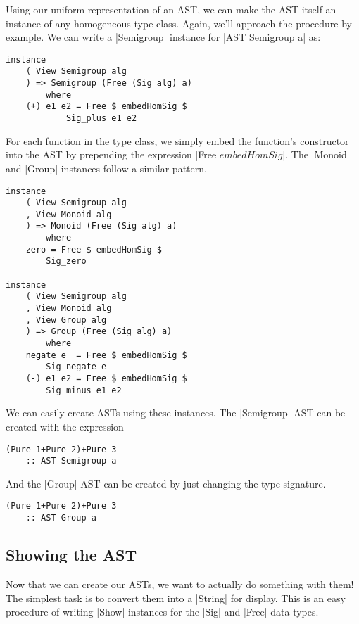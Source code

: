 \documentclass[preprint]{sigplanconf}
\theoremstyle{definition}
\begin{document}

Using our uniform representation of an AST,
we can make the AST itself an instance of any homogeneous type class.
Again, we'll approach the procedure by example.
We can write a |Semigroup| instance for |AST Semigroup a| as:
\begin{lstlisting}
instance
    ( View Semigroup alg
    ) => Semigroup (Free (Sig alg) a)
        where
    (+) e1 e2 = Free $ embedHomSig $
            Sig_plus e1 e2
\end{lstlisting}
For each function in the type class,
we simply embed the function's constructor into the AST by prepending the expression |Free $ embedHomSig $|.
The |Monoid| and |Group| instances follow a similar pattern.
\begin{lstlisting}
instance
    ( View Semigroup alg
    , View Monoid alg
    ) => Monoid (Free (Sig alg) a)
        where
    zero = Free $ embedHomSig $
        Sig_zero

instance
    ( View Semigroup alg
    , View Monoid alg
    , View Group alg
    ) => Group (Free (Sig alg) a)
        where
    negate e  = Free $ embedHomSig $
        Sig_negate e
    (-) e1 e2 = Free $ embedHomSig $
        Sig_minus e1 e2
\end{lstlisting}
We can easily create ASTs using these instances.
The |Semigroup| AST can be created with the expression
\begin{lstlisting}
(Pure 1+Pure 2)+Pure 3
    :: AST Semigroup a
\end{lstlisting}
And the |Group| AST can be created by just changing the type signature.
\begin{lstlisting}
(Pure 1+Pure 2)+Pure 3
    :: AST Group a
\end{lstlisting}

\subsection{Showing the AST}
Now that we can create our ASTs, we want to actually do something with them!
The simplest task is to convert them into a |String| for display.
This is an easy procedure of writing |Show| instances for the |Sig| and |Free| data types.
\end{document}
